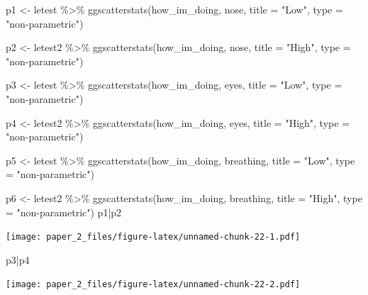 \documentclass[
]{article}
\newenvironment{Shaded}{\begin{snugshade}}{\end{snugshade}}
\newcommand{\AttributeTok}[1]{\textcolor[rgb]{0.77,0.63,0.00}{#1}}
\newcommand{\FunctionTok}[1]{\textcolor[rgb]{0.00,0.00,0.00}{#1}}
\newcommand{\NormalTok}[1]{#1}
\newcommand{\OtherTok}[1]{\textcolor[rgb]{0.56,0.35,0.01}{#1}}
\newcommand{\SpecialCharTok}[1]{\textcolor[rgb]{0.00,0.00,0.00}{#1}}
\newcommand{\StringTok}[1]{\textcolor[rgb]{0.31,0.60,0.02}{#1}}
\begin{document}
\begin{Shaded}
\begin{Highlighting}[]
\NormalTok{p1 }\OtherTok{\textless{}{-}}\NormalTok{ letest }\SpecialCharTok{\%\textgreater{}\%}
  \FunctionTok{ggscatterstats}\NormalTok{(how\_im\_doing, nose, }\AttributeTok{title =} \StringTok{"Low"}\NormalTok{, }\AttributeTok{type =} \StringTok{"non{-}parametric"}\NormalTok{)}


\NormalTok{p2 }\OtherTok{\textless{}{-}}\NormalTok{ letest2 }\SpecialCharTok{\%\textgreater{}\%}
  \FunctionTok{ggscatterstats}\NormalTok{(how\_im\_doing, nose, }\AttributeTok{title =} \StringTok{"High"}\NormalTok{, }\AttributeTok{type =} \StringTok{"non{-}parametric"}\NormalTok{)}

\NormalTok{p3 }\OtherTok{\textless{}{-}}\NormalTok{ letest }\SpecialCharTok{\%\textgreater{}\%}
  \FunctionTok{ggscatterstats}\NormalTok{(how\_im\_doing, eyes, }\AttributeTok{title =} \StringTok{"Low"}\NormalTok{, }\AttributeTok{type =} \StringTok{"non{-}parametric"}\NormalTok{)}


\NormalTok{p4 }\OtherTok{\textless{}{-}}\NormalTok{ letest2 }\SpecialCharTok{\%\textgreater{}\%}
  \FunctionTok{ggscatterstats}\NormalTok{(how\_im\_doing, eyes, }\AttributeTok{title =} \StringTok{"High"}\NormalTok{, }\AttributeTok{type =} \StringTok{"non{-}parametric"}\NormalTok{)}

\NormalTok{p5 }\OtherTok{\textless{}{-}}\NormalTok{ letest }\SpecialCharTok{\%\textgreater{}\%}
  \FunctionTok{ggscatterstats}\NormalTok{(how\_im\_doing, breathing, }\AttributeTok{title =} \StringTok{"Low"}\NormalTok{, }\AttributeTok{type =} \StringTok{"non{-}parametric"}\NormalTok{)}


\NormalTok{p6 }\OtherTok{\textless{}{-}}\NormalTok{ letest2 }\SpecialCharTok{\%\textgreater{}\%}
  \FunctionTok{ggscatterstats}\NormalTok{(how\_im\_doing, breathing, }\AttributeTok{title =} \StringTok{"High"}\NormalTok{, }\AttributeTok{type =} \StringTok{"non{-}parametric"}\NormalTok{)}
\NormalTok{p1}\SpecialCharTok{|}\NormalTok{p2}
\end{Highlighting}
\end{Shaded}

\texttt{[image: paper\_2\_files/figure-latex/unnamed-chunk-22-1.pdf]}

\begin{Shaded}
\begin{Highlighting}[]
\NormalTok{p3}\SpecialCharTok{|}\NormalTok{p4}
\end{Highlighting}
\end{Shaded}

\texttt{[image: paper\_2\_files/figure-latex/unnamed-chunk-22-2.pdf]}
\end{document}
